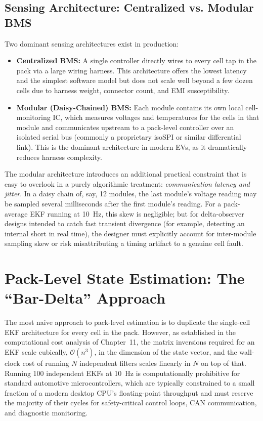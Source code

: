 \subsection{Sensing Architecture: Centralized vs. Modular BMS}
\label{subsec:14_sensing_arch}

Two dominant sensing architectures exist in production:

\begin{itemize}
    \item \textbf{Centralized BMS:} A single controller directly wires to every cell tap in the pack via a large wiring harness. This architecture offers the lowest latency and the simplest software model but does not scale well beyond a few dozen cells due to harness weight, connector count, and EMI susceptibility.
    \item \textbf{Modular (Daisy-Chained) BMS:} Each module contains its own local cell-monitoring IC, which measures voltages and temperatures for the cells in that module and communicates upstream to a pack-level controller over an isolated serial bus (commonly a proprietary isoSPI or similar differential link). This is the dominant architecture in modern EVs, as it dramatically reduces harness complexity.
\end{itemize}

The modular architecture introduces an additional practical constraint that is easy to overlook in a purely algorithmic treatment: \emph{communication latency and jitter}. In a daisy chain of, say, 12 modules, the last module's voltage reading may be sampled several milliseconds after the first module's reading. For a pack-average EKF running at 10~Hz, this skew is negligible; but for delta-observer designs intended to catch fast transient divergence (for example, detecting an internal short in real time), the designer must explicitly account for inter-module sampling skew or risk misattributing a timing artifact to a genuine cell fault.

\section{Pack-Level State Estimation: The ``Bar-Delta'' Approach}
\label{sec:14_bar_delta}

The most naive approach to pack-level estimation is to duplicate the single-cell EKF architecture for every cell in the pack. However, as established in the computational cost analysis of Chapter~11, the matrix inversions required for an EKF scale cubically, $\mathcal{O}(n^3)$, in the dimension of the state vector, and the wall-clock cost of running $N$ independent filters scales linearly in $N$ on top of that. Running 100 independent EKFs at 10~Hz is computationally prohibitive for standard automotive microcontrollers, which are typically constrained to a small fraction of a modern desktop CPU's floating-point throughput and must reserve the majority of their cycles for safety-critical control loops, CAN communication, and diagnostic monitoring.


